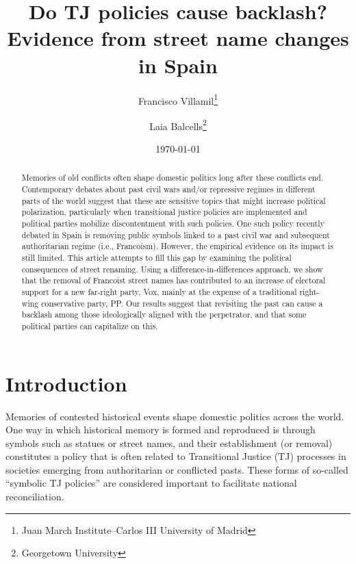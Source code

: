 \documentclass[12pt, titlepage]{article}
\title{\Large Do TJ policies cause backlash?\\Evidence from street name changes in Spain}
\author{Francisco Villamil\footnote{Juan March Institute--Carlos III University of Madrid} \and Laia Balcells\footnote{Georgetown University}}
\date{\today}
\begin{document}
\maketitle

\begin{abstract}
\noindent
Memories of old conflicts often shape domestic politics long after these conflicts end. Contemporary debates about past civil wars and/or repressive regimes in different parts of the world suggest that these are sensitive topics that might increase political polarization, particularly when transitional justice policies are implemented and political parties mobilize discontentment with such policies. One such policy recently debated in Spain is removing public symbols linked to a past civil war and subsequent authoritarian regime (i.e., Francoism). However, the empirical evidence on its impact is still limited. This article attempts to fill this gap by examining the political consequences of street renaming. Using a difference-in-differences approach, we show that the removal of Francoist street names has contributed to an increase of electoral support for a new far-right party, Vox, mainly at the expense of a traditional right-wing conservative party, PP. Our results suggest that revisiting the past can cause a backlash among those ideologically aligned with the perpetrator, and that some political parties can capitalize on this.

\vspace{10pt}
\noindent

\end{abstract}

\newpage
\section*{Introduction}

Memories of contested historical events shape domestic politics across the world. One way in which historical memory is formed and reproduced is through symbols such as statues or street names, and their establishment (or removal) constitutes a policy that is often related to Transitional Justice (TJ) processes in societies emerging from authoritarian or conflicted pasts. These forms of so-called ``symbolic TJ policies'' are considered important to facilitate national reconciliation.

\end{document}

